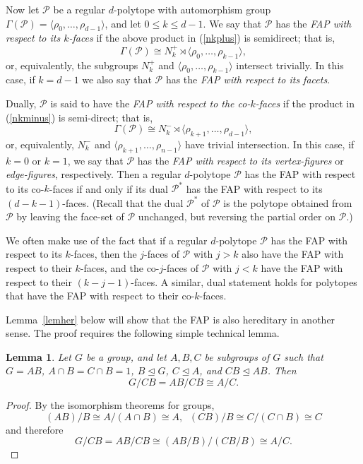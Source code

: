 \documentclass[12pt]{amsart}
\newtheorem{lemma}[theorem]{Lemma}
\theoremstyle{definition}
\begin{document}
Now let $\mathcal{P}$ be a regular $d$-polytope with automorphism group $\Gamma(\mathcal{P}) =\langle\rho_{0},\ldots,\rho_{d-1}\rangle$, and let $0 \leq k \leq d-1$.   We say that $\mathcal{P}$ has the {\em FAP with respect to its $k$-faces\/} if the above product in (\ref{nkplus}) is semidirect; that is, \[\Gamma(\mathcal{P}) \cong N_{k}^{+} \rtimes \langle\rho_{0},\ldots,\rho_{k-1}\rangle,\]
or, equivalently, the subgroups $N_{k}^{+}$ and $\langle\rho_{0},\ldots,\rho_{k-1}\rangle$ intersect trivially. In this case, if $k=d-1$ we also say that $\mathcal{P}$ has the {\em FAP with respect to its facets\/}.

Dually, $\mathcal{P}$ is said to have the {\em FAP with respect to the co-$k$-faces\/} if the product in (\ref{nkminus}) is semi-direct; that is,
\[\Gamma(\mathcal{P}) \cong N_{k}^{-} \rtimes \langle\rho_{k+1},\ldots,\rho_{d-1}\rangle,\]
or, equivalently, $N_{k}^{-}$ and $\langle\rho_{k+1},\ldots,\rho_{n-1}\rangle$ have trivial intersection. In this case, if $k=0$ or $k=1$, we say that $\mathcal{P}$ has the {\em FAP with respect to its vertex-figures\/} or {\em edge-figures\/}, respectively. Then a regular $d$-polytope $\mathcal{P}$ has the FAP with respect to its co-$k$-faces if and only if its dual $\mathcal{P}^{*}$ has the FAP with respect to its $(d-k-1)$-faces.  (Recall that the dual $\mathcal{P}^{*}$ of $\mathcal{P}$ is the polytope obtained from $\mathcal{P}$ by leaving the face-set of $\mathcal{P}$ unchanged, but reversing the partial order on $\mathcal{P}$.)

We often make use of the fact that if a regular $d$-polytope $\mathcal{P}$ has the
FAP with respect to its $k$-faces, then the $j$-faces of $\mathcal{P}$ with $j>k$ also have the FAP with respect to their $k$-faces, and the co-$j$-faces of $\mathcal{P}$ with $j<k$ have the FAP with respect to their $(k-j-1)$-faces. A similar, dual statement holds for polytopes that have the FAP with respect to their co-$k$-faces.

Lemma~\ref{lemher} below will show that the FAP is also hereditary in another sense. The proof requires the following simple technical lemma.

\begin{lemma}
\label{lemABC}
Let $G$ be a group, and let $A,B,C$ be subgroups of $G$ such that $G=AB$, $A\cap B=C\cap B=1$, $B\unlhd G$, $C\unlhd A$, and $CB\unlhd AB$. Then 
\[ G/CB = AB/CB \cong A/C.\]
\end{lemma}

\begin{proof} 
By the isomorphism theorems for groups,
\[(AB)/B \cong A/(A\cap B) \cong A,\;\; (CB)/B \cong C/(C\cap B) \cong C\] 
and therefore
\[G/CB = AB/CB \cong (AB/B)/(CB/B)\cong A/C.\]
\end{proof}
\smallskip
\end{document}
